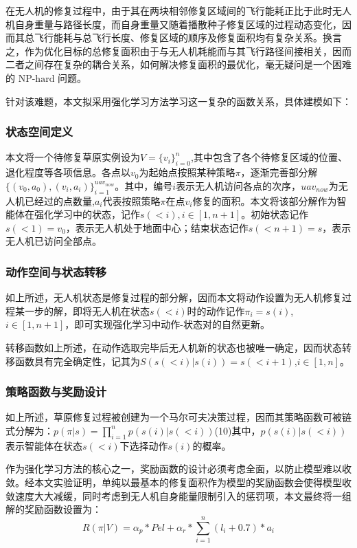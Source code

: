 \documentclass[AutoFakeBold]{LZUThesis}
\begin{document}
在无人机的修复过程中，由于其在两块相邻修复区域间的飞行能耗正比于此时无人机自身重量与路径长度，而自身重量又随着播散种子修复区域的过程动态变化，因而其总飞行能耗与总飞行长度、修复区域的顺序及修复面积均有复杂关系。换言之，作为优化目标的总修复面积由于与无人机耗能而与其飞行路径间接相关，因而二者之间存在复杂的耦合关系，如何解决修复面积的最优化，毫无疑问是一个困难的 $\text{NP-hard}$ 问题。

针对该难题，本文拟采用强化学习方法学习这一复杂的函数关系，具体建模如下：

\subsubsection{状态空间定义}

本文将一个待修复草原实例设为$V=\{v_i\}_{i=0}^n$,其中包含了各个待修复区域的位置、退化程度等各项信息。各点以$v_0$为起始点按照某种策略$\pi$，逐渐完善部分解$\{(v_0,a_0),(v_i,a_i)\}_{i=1}^{uav_{now}}$。其中，编号$i$表示无人机访问各点的次序，$uav_{now}$为无人机已经过的点数量,$a_i$代表按照策略$\pi$在点$v_i$修复的面积。本文将该部分解作为智能体在强化学习中的状态，记作$s(<i),i\in[1,n+1]$。初始状态记作$s(<1)=v_0$，表示无人机处于地面中心；结束状态记作$s(<n+1)=s$，表示无人机已访问全部点。

\subsubsection{动作空间与状态转移}

如上所述，无人机状态是修复过程的部分解，因而本文将动作设置为无人机修复过程某一步的解，即将无人机在状态$s(<i)$时的动作记作$\pi_i=s(i)$,$i\in[1,n+1]$，即可实现强化学习中动作-状态对的自然更新。

转移函数如上所述，在动作选取完毕后无人机新的状态也被唯一确定，因而状态转移函数具有完全确定性，记其为$S(s(<i)|s(i))=s(<i+1)$,$i\in[1,n]$。

\subsubsection{策略函数与奖励设计}

如上所述，草原修复过程被创建为一个马尔可夫决策过程，因而其策略函数可被链式分解为：$p(\pi|s)=\prod_{i=1}^n p(s(i)|s(<i))$(10)其中，$p(s(i)|s(<i))$表示智能体在状态$s(<i)$下选择动作$s(i)$的概率。

作为强化学习方法的核心之一，奖励函数的设计必须考虑全面，以防止模型难以收敛。经本文实验证明，单纯以最基本的修复面积作为模型的奖励函数会使得模型收敛速度大大减缓，同时考虑到无人机自身能量限制引入的惩罚项，本文最终将一组解的奖励函数设置为：
\begin{equation}
	R(\pi|V)=\alpha_{p}*Pel+\alpha_{r}*\sum_{i=1}^{n}(l_i+0.7)*a_{i}
	\label{eq:11}
\end{equation}
\end{document}
